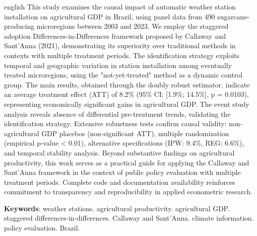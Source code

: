 \documentclass[
	12pt,				%
	oneside,			%
	a4paper,			%
	english,			%
	french,				%
	spanish,			%
	brazil				%
	]{abntex2}
\begin{document}
\begin{resumo}[Abstract]
 \begin{otherlanguage*}{english}
This study examines the causal impact of automatic weather station installation on agricultural GDP in Brazil, using panel data from 490 sugarcane-producing microregions between 2003 and 2023. We employ the staggered adoption Differences-in-Differences framework proposed by Callaway and Sant'Anna (2021), demonstrating its superiority over traditional methods in contexts with multiple treatment periods. The identification strategy exploits temporal and geographic variation in station installation among eventually treated microregions, using the "not-yet-treated" method as a dynamic control group. The main results, obtained through the doubly robust estimator, indicate an average treatment effect (ATT) of 8.2\% (95\% CI: [1.9\%; 14.5\%], p = 0.0103), representing economically significant gains in agricultural GDP. The event study analysis reveals absence of differential pre-treatment trends, validating the identification strategy. Extensive robustness tests confirm causal validity: non-agricultural GDP placebos (non-significant ATT), multiple randomization (empirical p-value < 0.01), alternative specifications (IPW: 9.4\%, REG: 6.6\%), and temporal stability analysis. Beyond substantive findings on agricultural productivity, this work serves as a practical guide for applying the Callaway and Sant'Anna framework in the context of public policy evaluation with multiple treatment periods. Complete code and documentation availability reinforces commitment to transparency and reproducibility in applied econometric research.

   \textbf{Keywords}: weather stations. agricultural productivity. agricultural GDP. staggered differences-in-differences. Callaway and Sant'Anna. climate information. policy evaluation. Brazil.
 \end{otherlanguage*}
\end{resumo}

\listoffigures*
\cleardoublepage

\listoftables*
\cleardoublepage

\tableofcontents*
\cleardoublepage

\textual
\end{document}
